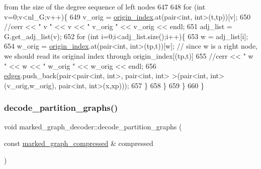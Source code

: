 \begin{DoxyCode}
{       from the size of the degree sequence of left nodes}
647     
648     \textcolor{keywordflow}{for} (\textcolor{keywordtype}{int} v=0;v<nl\_G;v++)\{
649       v\_orig = \hyperlink{classmarked__graph__decoder_aab3e2f6d4376ba96da32f25aa9ddd069}{origin\_index}.at(pair<int, int>(t,tp))[v];
650       \textcolor{comment}{//cerr << " v " << v << " v\_orig " << v\_orig << endl;}
651       adj\_list = G.get\_adj\_list(v);
652       \textcolor{keywordflow}{for} (\textcolor{keywordtype}{int} i=0;i<adj\_list.size();i++)\{
653         w = adj\_list[i];
654         w\_orig = \hyperlink{classmarked__graph__decoder_aab3e2f6d4376ba96da32f25aa9ddd069}{origin\_index}.at(pair<int, int>(tp,t))[w]; \textcolor{comment}{// since w is a right node, we
       should read its original index through origin\_index[(tp,t)]}
655         \textcolor{comment}{//cerr << " w " << w << " w\_orig " << w\_orig << endl;}
656         \hyperlink{classmarked__graph__decoder_af9e75da0a495d9c3bdcd169e15e3261e}{edges}.push\_back(pair<pair<int, int>, pair<int, int> >(pair<int, int>(v\_orig,w\_orig), pair<int,
       int>(x,xp)));
657       \}
658     \}
659   \}
660 \}
\end{DoxyCode}
\mbox{\label{classmarked__graph__decoder_a80eb5f68b45ba160b9a00334476b6be7}} 
\subsubsection{\texorpdfstring{decode\+\_\+partition\+\_\+graphs()}{decode\_partition\_graphs()}}
{\footnotesize\ttfamily void marked\+\_\+graph\+\_\+decoder\+::decode\+\_\+partition\+\_\+graphs (\begin{DoxyParamCaption}\item[{const \hyperlink{classmarked__graph__compressed}{marked\+\_\+graph\+\_\+compressed} \&}]{compressed }\end{DoxyParamCaption})\hspace{0.3cm}{\ttfamily [private]}}


